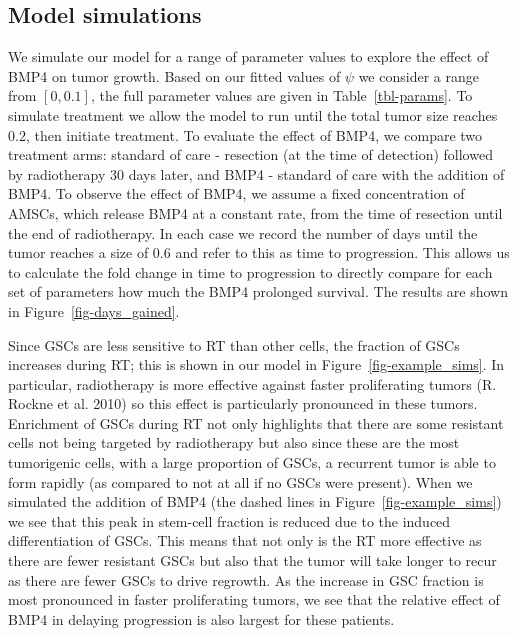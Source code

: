 \documentclass[
  default,
]{sn-jnl}
\begin{document}
\subsection{Model simulations}\label{sec-model-sims}

We simulate our model for a range of parameter values to explore the
effect of BMP4 on tumor growth. Based on our fitted values of \(\psi\)
we consider a range from \([0,0.1]\), the full parameter values are
given in Table~\ref{tbl-params}. To simulate treatment we allow the
model to run until the total tumor size reaches \(0.2\), then initiate
treatment. To evaluate the effect of BMP4, we compare two treatment
arms: standard of care - resection (at the time of detection) followed
by radiotherapy 30 days later, and BMP4 - standard of care with the
addition of BMP4. To observe the effect of BMP4, we assume a fixed
concentration of AMSCs, which release BMP4 at a constant rate, from the
time of resection until the end of radiotherapy. In each case we record
the number of days until the tumor reaches a size of \(0.6\) and refer
to this as time to progression. This allows us to calculate the fold
change in time to progression to directly compare for each set of
parameters how much the BMP4 prolonged survival. The results are shown
in Figure~\ref{fig-days_gained}.

Since GSCs are less sensitive to RT than other cells, the fraction of
GSCs increases during RT; this is shown in our model in
Figure~\ref{fig-example_sims}. In particular, radiotherapy is more
effective against faster proliferating tumors (R. Rockne et al. 2010) so
this effect is particularly pronounced in these tumors. Enrichment of
GSCs during RT not only highlights that there are some resistant cells
not being targeted by radiotherapy but also since these are the most
tumorigenic cells, with a large proportion of GSCs, a recurrent tumor is
able to form rapidly (as compared to not at all if no GSCs were
present). When we simulated the addition of BMP4 (the dashed lines in
Figure~\ref{fig-example_sims}) we see that this peak in stem-cell
fraction is reduced due to the induced differentiation of GSCs. This
means that not only is the RT more effective as there are fewer
resistant GSCs but also that the tumor will take longer to recur as
there are fewer GSCs to drive regrowth. As the increase in GSC fraction
is most pronounced in faster proliferating tumors, we see that the
relative effect of BMP4 in delaying progression is also largest for
these patients.
\end{document}
